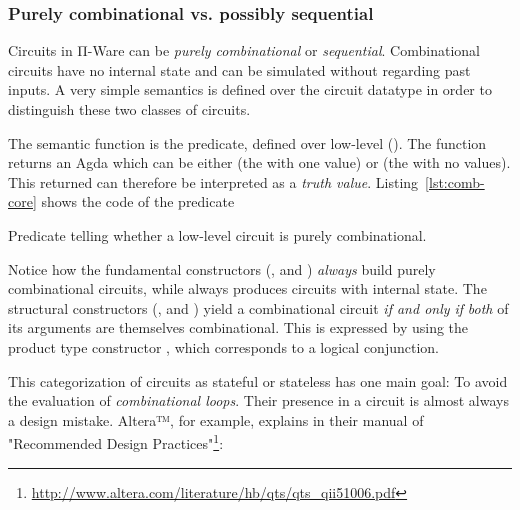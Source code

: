             \subsubsection{Purely combinational vs. possibly sequential}
            \label{subsubsec:comb-vs-seq}
            Circuits in Π-Ware can be \emph{purely combinational} or \emph{sequential}.
            Combinational circuits have no internal state and can be simulated without regarding past inputs.
            A very simple semantics is defined over the circuit datatype in order to distinguish
            these two classes of circuits.

            The semantic function is the  predicate, defined over low-level ().
            The  function returns an Agda  which can be either 
            (the  with one value) or  (the  with no values).
            This returned  can therefore be interpreted as a \emph{truth value}.
            Listing~\ref{lst:comb-core} shows the code of the  predicate

            \begin{listing}[h]
                \caption{Predicate telling whether a low-level circuit is purely combinational.\label{lst:comb-core}}
            \end{listing}

            Notice how the fundamental constructors (,  and ) \emph{always}
            build purely combinational circuits, while  always produces circuits with internal state.
            The structural constructors (,  and ) yield a combinational circuit
            \emph{if and only if} \emph{both} of its arguments are themselves combinational.
            This is expressed by using the product type constructor ,
            which corresponds to a logical conjunction.

            This categorization of circuits as stateful or stateless has one main goal:
            To avoid the evaluation of \emph{combinational loops}.
            Their presence in a circuit is almost always a design mistake.
            Altera™, for example, explains in their manual of "Recommended Design
            Practices"\footnote{\url{http://www.altera.com/literature/hb/qts/qts\_qii51006.pdf}}:

